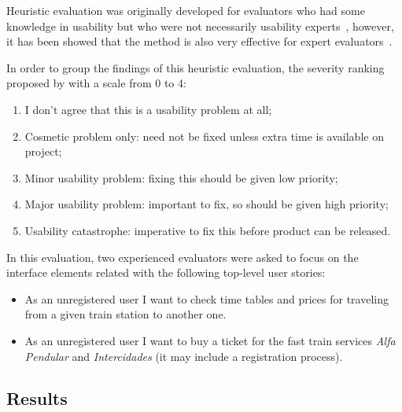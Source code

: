 \documentclass[a4paper]{article}
\begin{document}
Heuristic evaluation was originally developed for evaluators who had some knowledge in usability but who were not necessarily usability experts~\citep{nielsen1990heuristic}, however, it has been showed that the method is also very effective for expert evaluators~\citep{nielsen1992finding}.

In order to group the findings of this heuristic evaluation, the severity ranking proposed by \citet{nielsen1995rating} with a scale from 0 to 4:

\begin{enumerate}[start=0, label={\theenumi{} -}]
\item I don't agree that this is a usability problem at all;
\item Cosmetic problem only: need not be fixed unless extra time is available on project;
\item Minor usability problem: fixing this should be given low priority;
\item Major usability problem: important to fix, so should be given high priority;
\item Usability catastrophe: imperative to fix this before product can be released.
\end{enumerate}

In this evaluation, two experienced evaluators were asked to focus on the interface elements related with the following top-level user stories:
\begin{itemize}
  \item As an unregistered user I want to check time tables and prices for traveling from a given train station to another one.
  \item As an unregistered user I want to buy a ticket for the fast train services \textit{Alfa Pendular} and \textit{Intercidades} (it may include a registration process).
\end{itemize}

\subsection{Results}
\end{document}
